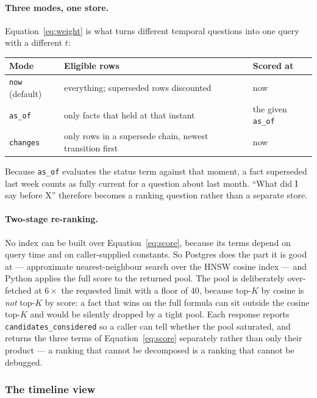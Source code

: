 \documentclass[11pt,a4paper]{article}
\begin{document}
\paragraph{Three modes, one store.} Equation~\eqref{eq:weight} is what turns
different temporal questions into one query with a different $t$:

\begin{center}
\begin{tabular}{lll}
\toprule
\textbf{Mode} & \textbf{Eligible rows} & \textbf{Scored at}\\
\midrule
\texttt{now} (default) & everything; superseded rows discounted & now\\
\texttt{as\_of} & only facts that held at that instant & the given \texttt{as\_of}\\
\texttt{changes} & only rows in a supersede chain, newest transition first & now\\
\bottomrule
\end{tabular}
\end{center}

\noindent Because \texttt{as\_of} evaluates the status term against that moment,
a fact superseded last week counts as fully current for a question about last
month. ``What did I say before X'' therefore becomes a ranking question rather
than a separate store.

\paragraph{Two-stage re-ranking.} No index can be built over
Equation~\eqref{eq:score}, because its terms depend on query time and on
caller-supplied constants. So Postgres does the part it is good at ---
approximate nearest-neighbour search over the HNSW cosine index --- and Python
applies the full score to the returned pool. The pool is deliberately
over-fetched at $6\times$ the requested limit with a floor of 40, because
top-$K$ by cosine is \emph{not} top-$K$ by score: a fact that wins on the full
formula can sit outside the cosine top-$K$ and would be silently dropped by a
tight pool. Each response reports \texttt{candidates\_considered} so a caller
can tell whether the pool saturated, and returns the three terms of
Equation~\eqref{eq:score} separately rather than only their product --- a
ranking that cannot be decomposed is a ranking that cannot be debugged.

\subsubsection{The timeline view}
\end{document}

